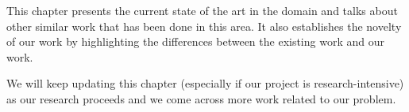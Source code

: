 This chapter presents the current state of the art in the domain and talks about other similar work that has been done in this area. It also establishes the novelty of our work by highlighting the differences between the existing work and our work.

We will keep updating this chapter (especially if our project is research-intensive) as our research proceeds and we come across more work related to our problem.
